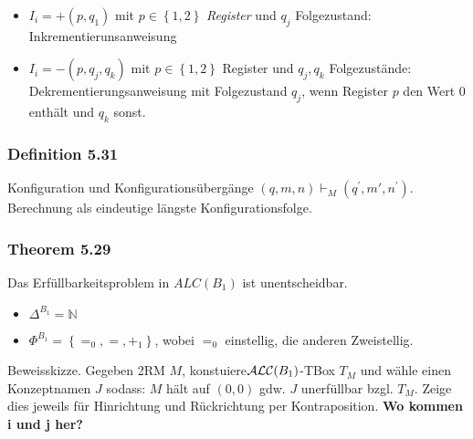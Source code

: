 \begin{itemize}
\item
  $I_{i} = + (p,q_1)$ mit $p \in \left\{ 1,2 \right\}$
  \emph{Register} und $q_{j}$ Folgezustand: Inkrementierunsanweisung
\item
  $I_{i} = - (p,q_{j},q_{k})$ mit $p \in \left\{ 1,2 \right\}$
  Register und $q_{j},q_{k}$ Folgezustände: Dekrementierungsanweisung
  mit Folgezustand $q_{j}$, wenn Register $p$ den Wert $0$ enthält
  und $q_{k}$ sonst.
\end{itemize}

\subsubsection{Definition 5.31}\label{definition-5.31}

Konfiguration und Konfigurationsübergänge
$\left( q,m,n \right) \vdash_{M}(q^{'},m',n^{'})$. Berechnung als
eindeutige längste Konfigurationsfolge.

\subsubsection{Theorem 5.29}\label{theorem-5.29}

Das Erfüllbarkeitsproblem in $ALC(B_1)$ ist unentscheidbar.

\begin{itemize}
\item
  $\Delta^{B_1}\mathbb{= N}$
\item
  $\Phi^{B_1} = \left\{ =_{0}, = , +_1 \right\}$, wobei $=_{0}$
  einstellig, die anderen Zweistellig.
\end{itemize}

Beweisskizze. Gegeben 2RM $M$,
konstuiere$\text {$\ALC$}\left( B_1 \right)$-TBox $T_{M}$ und wähle
einen Konzeptnamen $J$ sodass: $M$ hält auf $\left( 0,0 \right)$
gdw. $J$ unerfüllbar bzgl. $T_{M}$. Zeige dies jeweils für
Hinrichtung und Rückrichtung per Kontraposition. \textbf{Wo kommen i und
j her?}
